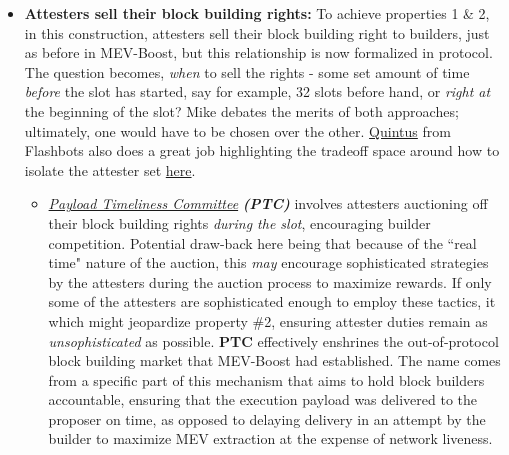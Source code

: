 \documentclass[12pt]{article}
\begin{document}
\begin{itemize}
    \item \textbf{Attesters sell their block building rights:} To achieve properties 1 \& 2, in this construction, attesters sell their block building right to builders, just as before in MEV-Boost, but this relationship is now formalized in protocol. The question becomes, \textit{when} to sell the rights - some set amount of time \textit{before} the slot has started, say for example, 32 slots before hand, or \textit{right at} the beginning of the slot? Mike debates the merits of both approaches; ultimately, one would have to be chosen over the other. \href{https://x.com/0xquintus?lang=en}{Quintus} from Flashbots also does a great job highlighting the tradeoff space around how to isolate the attester set \href{https://collective.flashbots.net/t/isolating-attesters-from-mev/3837}{here}. 
    \begin{itemize}
        \item \href{https://ethresear.ch/t/payload-timeliness-committee-ptc-an-epbs-design/16054}{\textit{Payload Timeliness Committee}} \textbf{\textit{(PTC)}} involves attesters auctioning off their block building rights \textit{during the slot}, encouraging builder competition. Potential draw-back here being that because of the ``real time" nature of the auction, this \textit{may} encourage sophisticated strategies by the attesters during the auction process to maximize rewards. If only some of the attesters are sophisticated enough to employ these tactics, it which might jeopardize property \#2, ensuring attester duties remain as \textit{unsophisticated} as possible. \textbf{PTC} effectively enshrines the out-of-protocol block building market that MEV-Boost had established.  The name comes from a specific part of this mechanism that aims to hold block builders accountable, ensuring that the execution payload was delivered to the proposer on time, as opposed to delaying delivery in an attempt by the builder to maximize MEV extraction at the expense of network liveness. 

\end{itemize}
\end{itemize}
\end{document}
